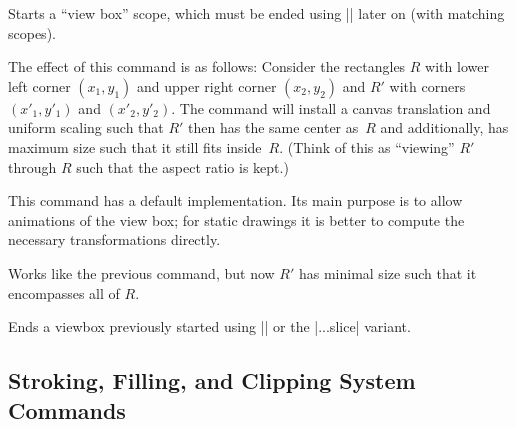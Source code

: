 \begin{command}{\pgfsys@viewboxmeet{}%
}
    Starts a ``view box'' scope, which must be ended using |\pgfsys@endviewbox|
    later on (with matching scopes).

    The effect of this command is as follows: Consider the rectangles $R$ with
    lower left corner $(x_1,y_1)$ and upper right corner $(x_2,y_2)$ and $R'$
    with corners $(x'_1,y'_1)$ and $(x'_2,y'_2)$. The command will install a
    canvas translation and uniform scaling such that $R'$ then has the same
    center as~$R$ and additionally, has maximum size such that it still fits
    inside~$R$. (Think of this as ``viewing'' $R'$ through $R$ such that the
    aspect ratio is kept.)

    This command has a default implementation. Its main purpose is to allow
    animations of the view box; for static drawings it is better to compute the
    necessary transformations directly.
\end{command}

\begin{command}{\pgfsys@viewboxslice{}%
}
    Works like the previous command, but now $R'$ has minimal size such that it
    encompasses all of $R$.
\end{command}

\begin{command}{\pgfsys@endviewbox}
    Ends a viewbox previously started using |\pgfsys@viewboxmeet| or the
    |...slice| variant.
\end{command}


\subsection{Stroking, Filling, and Clipping System Commands}

